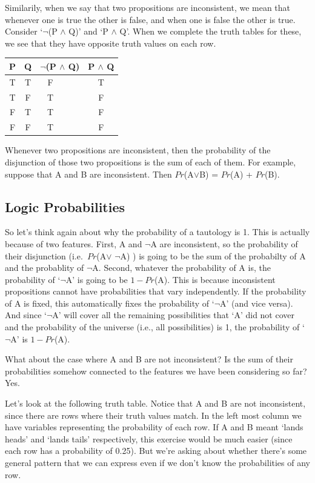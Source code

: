 \documentclass[]{tufte-book}
\begin{document}
Similarily, when we say that two propositions are inconsistent, we mean that whenever one is true the other is false, and when one is false the other is true. Consider `\(\neg\)(P \(\wedge\) Q)' and `P \(\wedge\) Q'. When we complete the truth tables for these, we see that they have opposite truth values on each row.

\begin{longtable}[]{@{}cccc@{}}
\toprule
P & Q & \(\neg\)(P \(\wedge\) Q) & P \(\wedge\) Q\tabularnewline
\midrule
\endhead
T & T & F\(~~~~~~~~~~\) & T\tabularnewline
T & F & T\(~~~~~~~~~~\) & F\tabularnewline
F & T & T\(~~~~~~~~~~\) & F\tabularnewline
F & F & T\(~~~~~~~~~~\) & F\tabularnewline
\bottomrule
\end{longtable}

Whenever two propositions are inconsistent, then the probability of the disjunction of those two propositions is the sum of each of them. For example, suppose that A and B are inconsistent. Then \(Pr\)(A\(\vee\)B) = \(Pr\)(A) + \(Pr\)(B).

\hypertarget{logic-probabilities}{%
\subsection{Logic Probabilities}\label{logic-probabilities}}

So let's think again about why the probability of a tautology is 1. This is actually because of two features. First, A and \(\neg\)A are inconsistent, so the probability of their disjunction (i.e.~\(Pr\)(A\(\vee\) \(\neg\)A) ) is going to be the sum of the probabilty of A and the probablity of \(\neg\)A. Second, whatever the probability of A is, the probability of `\(\neg\)A' is going to be \(1-Pr\)(A). This is because inconsistent propositions cannot have probabilities that vary independently. If the probability of A is fixed, this automatically fixes the probability of `\(\neg\)A' (and vice versa). And since `\(\neg\)A' will cover all the remaining possibilities that `A' did not cover and the probability of the universe (i.e., all possibilities) is 1, the probability of `\(\neg\)A' is \(1-Pr\)(A).

What about the case where A and B are not inconsistent? Is the sum of their probabilities somehow connected to the features we have been considering so far? Yes.

Let's look at the following truth table. Notice that A and B are not inconsistent, since there are rows where their truth values match. In the left most column we have variables representing the probability of each row. If A and B meant `lands heads' and `lands tails' respectively, this exercise would be much easier (since each row has a probability of 0.25). But we're asking about whether there's some general pattern that we can express even if we don't know the probabilities of any row.
\end{document}
